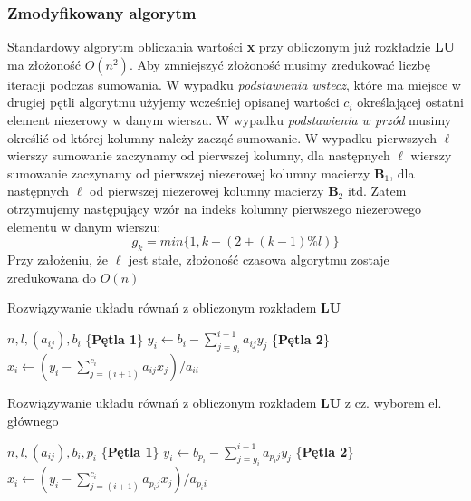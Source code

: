 \documentclass[12pt]{article}
\begin{document}
\subsubsection*{Zmodyfikowany algorytm}
Standardowy algorytm obliczania wartości \textbf{x} przy obliczonym już rozkładzie \textbf{LU} ma złożoność $O(n^2)$. Aby zmniejszyć złożoność musimy zredukować liczbę iteracji podczas sumowania. W wypadku \textit{podstawienia wstecz}, które ma miejsce w drugiej pętli algorytmu użyjemy wcześniej opisanej wartości $c_i$ określającej ostatni element niezerowy w danym wierszu. W wypadku \textit{podstawienia w przód} musimy określić od której kolumny należy zacząć sumowanie. W wypadku pierwszych $\ell$ wierszy sumowanie zaczynamy od pierwszej kolumny, dla następnych $\ell$ wierszy sumowanie zaczynamy od pierwszej niezerowej kolumny macierzy $\textbf{B}_1$, dla następnych $\ell$ od pierwszej niezerowej kolumny macierzy $\textbf{B}_2$ itd. Zatem otrzymujemy następujący wzór na indeks kolumny pierwszego niezerowego elementu w danym wierszu:
\begin{equation}
	g_k = min\{1, k - (2 + (k - 1) \% l)\}
\end{equation}
Przy założeniu, że $\ell$ jest stałe, złożoność czasowa algorytmu zostaje zredukowana do $O(n)$

\begin{algorithm} %
\caption{Rozwiązywanie układu równań z obliczonym rozkładem \textbf{LU}}
\label{alg7} %
\begin{algorithmic} %
    \REQUIRE $n, l, (a_{ij}), b_i$
    \STATE \{\textbf{Pętla 1}\}
		\STATE $y_i \leftarrow b_{i} - \sum^{i-1}_{j=g_i}a_{ij}y_j$
    \ENDFOR
    \STATE \{\textbf{Pętla 2}\}
		\STATE $x_i \leftarrow (y_{i} - \sum^{c_i}_{j=(i+1)}a_{ij}x_j)/a_{ii}$
    \ENDFOR
\end{algorithmic}
\end{algorithm}

\begin{algorithm} %
\caption{Rozwiązywanie układu równań z obliczonym rozkładem \textbf{LU} z cz. wyborem el. głównego}
\label{alg8} %
\begin{algorithmic} %
    \REQUIRE $n, l, (a_{ij}), b_i, p_i$
    \STATE \{\textbf{Pętla 1}\}
		\STATE $y_i \leftarrow b_{p_i} - \sum^{i-1}_{j=g_i}a_{p_ij}y_j$
    \ENDFOR
    \STATE \{\textbf{Pętla 2}\}
		\STATE $x_i \leftarrow (y_{i} - \sum^{c_i}_{j=(i+1)}a_{p_ij}x_j)/a_{p_ii}$
    \ENDFOR
\end{algorithmic}
\end{algorithm}
\end{document}
